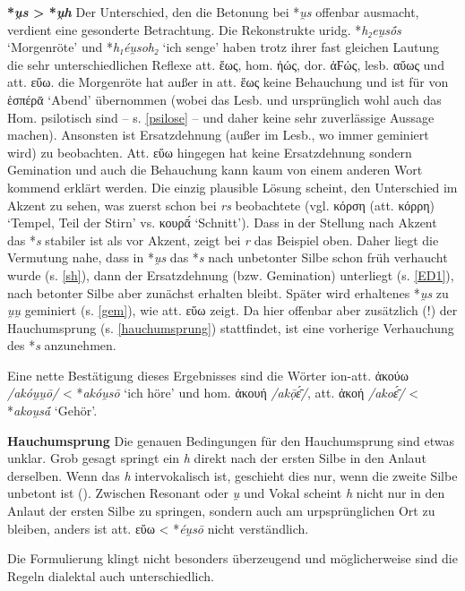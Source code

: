 \documentclass[12pt,a4paper,normalheadings,bibliography=totoc]{scrartcl}
\newcounter{para}
\newcommand{\mypara}[1]{\vspace{1em}\par\noindent\refstepcounter{para}%
\textbf{\textsf{\thepara}}\enspace\textbf{#1}\quad}
\def\rek#1{\mbox{*\textit{#1}}}
\def\bel#1{\mbox{\textit{#1}}}
\def\i#1{\mbox{\textit{#1}}}
\begin{document}
\mypara{\rek{u̯s} > \rek{u̯h}}
\label{uh}
Der Unterschied, den die Betonung bei \rek{u̯s} offenbar ausmacht,
verdient eine gesonderte Betrachtung.
Die Rekonstrukte uridg. \rek{h₂eu̯sṓs} `Morgenröte'
und \rek{h₁éu̯soh₂} `ich senge' haben trotz ihrer fast gleichen Lautung
die sehr unterschiedlichen Reflexe att. ἕως, hom. ἠώς, dor. ἀϜώς, lesb. αὔως
und att. εὕω.
die Morgenröte hat außer in att. ἕως keine Behauchung
und ist für \textcite[12]{sommer} von ἑσπέρᾱ `Abend' übernommen
(wobei das Lesb. und ursprünglich wohl auch das Hom. psilotisch sind --
s. \ref{psilose} -- und daher keine sehr zuverlässige Aussage machen).
Ansonsten ist Ersatzdehnung (außer im Lesb., wo immer geminiert wird) zu beobachten.
Att. εὕω hingegen hat keine Ersatzdehnung sondern Gemination
und auch die Behauchung kann kaum von einem anderen Wort kommend erklärt werden.
Die einzig plausible Lösung scheint, den Unterschied im Akzent zu sehen,
was \textcite{wackernagel} zuerst schon bei \bel{rs} beobachtete
(vgl. κόρση (att. κόρρη) `Tempel, Teil der Stirn' vs. κουρᾱ́ `Schnitt').
Dass in der Stellung nach Akzent das \rek{s} stabiler ist als vor Akzent,
zeigt bei \bel{r} das Beispiel oben.
Daher liegt die Vermutung nahe,
dass in \rek{u̯s} das \rek{s} nach unbetonter Silbe
schon früh verhaucht wurde (s. \ref{sh}),
dann der Ersatzdehnung (bzw. Gemination) unterliegt (s. \ref{ED1}),
nach betonter Silbe aber zunächst erhalten bleibt.
Später wird erhaltenes \rek{u̯s} zu \bel{u̯u̯} geminiert (s. \ref{gem}),
wie att. εὕω zeigt.
Da hier offenbar aber zusätzlich (!) der Hauchumsprung (s. \ref{hauchumsprung})
stattfindet,
ist eine vorherige Verhauchung des \rek{s} anzunehmen.

Eine nette Bestätigung dieses Ergebnisses sind die
Wörter ion-att. ἀκούω \bel{/akóu̯u̯ō/} < \rek{akóu̯sō} `ich höre'
und hom. ἀκουή \bel{/akọ̄ε̄́/}, att. ἀκοή \bel{/akoε̄́/} < \rek{akou̯sā́} `Gehör'.

\lex{\i{s}}{\i{h}}{\i{u̯}\_}

\mypara{Hauchumsprung}
\label{hauchumsprung}
Die genauen Bedingungen für den Hauchumsprung sind etwas unklar.
Grob gesagt springt ein \bel{h} direkt nach der ersten Silbe
in den Anlaut derselben.
Wenn das \bel{h} intervokalisch ist,
geschieht dies nur, wenn die zweite Silbe unbetont ist (\cite[10]{sommer}).
Zwischen Resonant oder \bel{u̯} und Vokal scheint \bel{h}
nicht nur in den Anlaut der ersten Silbe zu springen,
sondern auch am urpsprünglichen Ort zu bleiben,
anders ist att. εὕω < \rek{éu̯sō} nicht verständlich.

Die Formulierung klingt  nicht besonders überzeugend und
möglicherweise sind die Regeln dialektal auch unterschiedlich.
\end{document}
